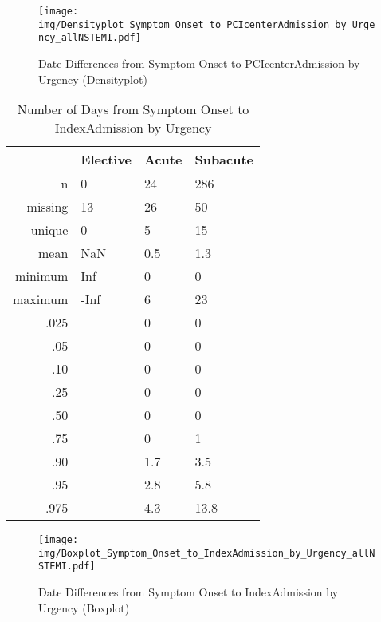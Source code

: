 \documentclass[presentation,xcolor=pdftex,dvipsnames,table,11pt]{beamer}
\begin{document}
\begin{tiny}
\begin{frame}
\begin{figure}
  \centering
  \caption{Date Differences from Symptom Onset to PCIcenterAdmission by Urgency (Densityplot)}
  \label{Density: Date Differences from Symptom Onset to PCIcenterAdmission by Urgency}
\texttt{[image: img/Densityplot\_Symptom\_Onset\_to\_PCIcenterAdmission\_by\_Urgency\_allNSTEMI.pdf]}\end{figure}
\end{frame}




\begin{table}[ht]
\centering
\begin{tabular}{rlll}
  \toprule
 & Elective & Acute & Subacute \\ 
  \midrule
n & 0 & 24 & 286 \\ 
  missing & 13 & 26 & 50 \\ 
  unique & 0 & 5 & 15 \\ 
  mean & NaN & 0.5 & 1.3 \\ 
  minimum & Inf & 0 & 0 \\ 
  maximum & -Inf & 6 & 23 \\ 
  .025 &  & 0 & 0 \\ 
  .05 &  & 0 & 0 \\ 
  .10 &  & 0 & 0 \\ 
  .25 &  & 0 & 0 \\ 
  .50 &  & 0 & 0 \\ 
  .75 &  & 0 & 1 \\ 
  .90 &  & 1.7 & 3.5 \\ 
  .95 &  & 2.8 & 5.8 \\ 
  .975 &  & 4.3 & 13.8 \\ 
   \bottomrule
\end{tabular}
\caption{Number of Days from Symptom Onset to IndexAdmission by Urgency} 
\end{table}
\begin{frame}
\begin{figure}
  \centering
  \caption{Date Differences from Symptom Onset to IndexAdmission by Urgency (Boxplot)}
  \label{Boxplot: Date Differences from Symptom Onset to IndexAdmission by Urgency}
\texttt{[image: img/Boxplot\_Symptom\_Onset\_to\_IndexAdmission\_by\_Urgency\_allNSTEMI.pdf]}\end{figure}
\end{frame}



\end{tiny}
\end{document}
